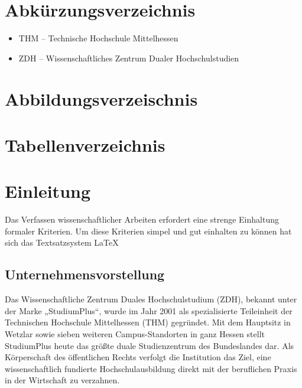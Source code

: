 \documentclass[12pt,a4paper]{scrartcl}
\newenvironment{listing}
{ \begin{itemize}[noitemsep, nolistsep]    }
	{ \end{itemize} }
\begin{document}
	\newpage
	
	\tableofcontents
	
	\newpage
	
	\section{Abkürzungsverzeichnis}
	\begin{listing}
		\item[] THM – Technische Hochschule Mittelhessen
		\item[] ZDH – Wissenschaftliches Zentrum Dualer Hochschulstudien
	\end{listing}
	\newpage
	
	\section{Abbildungsverzeischnis}
	
	\newpage
	\section{Tabellenverzeichnis}
	
	\newpage
	\section{Einleitung}
	Das Verfassen wissenschaftlicher Arbeiten erfordert eine strenge Einhaltung formaler Kriterien. Um diese Kriterien simpel und gut einhalten zu können hat sich das Textsatzsystem LaTeX 
	
	
	\subsection{Unternehmensvorstellung}
	Das Wissenschaftliche Zentrum Duales Hochschulstudium (ZDH), bekannt unter der Marke „StudiumPlus“, wurde im Jahr 2001 als spezialisierte Teileinheit der Technischen Hochschule Mittelhessen (THM) gegründet. Mit dem Hauptsitz in Wetzlar sowie sieben weiteren Campus-Standorten in ganz Hessen stellt StudiumPlus heute das größte duale Studienzentrum des Bundeslandes dar. Als Körperschaft des öffentlichen Rechts verfolgt die Institution das Ziel, eine wissenschaftlich fundierte Hochschulausbildung direkt mit der beruflichen Praxis in der Wirtschaft zu verzahnen.
	
\end{document}
